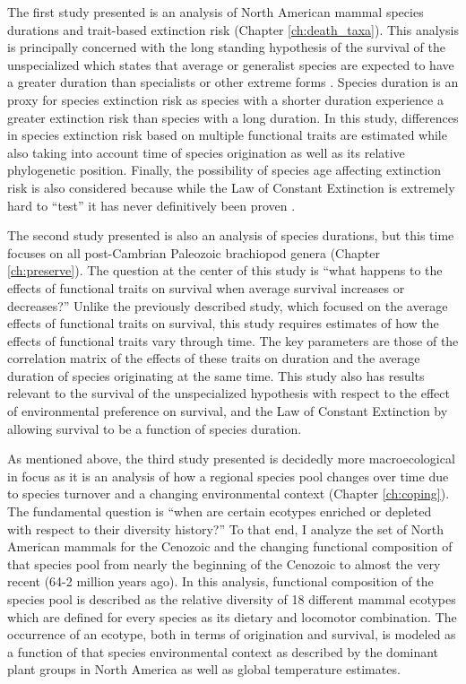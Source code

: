 The first study presented is an analysis of North American mammal species durations and trait-based extinction risk (Chapter \ref{ch:death_taxa}). This analysis is principally concerned with the long standing hypothesis of the survival of the unspecialized which states that average or generalist species are expected to have a greater duration than specialists or other extreme forms \citep{Simpson1944,Liow2004a,Liow2007b}. Species duration is an proxy for species extinction risk as species with a shorter duration experience a greater extinction risk than species with a long duration. In this study, differences in species extinction risk based on multiple functional traits are estimated while also taking into account time of species origination as well as its relative phylogenetic position. Finally, the possibility of species age affecting extinction risk is also considered because while the Law of Constant Extinction is extremely hard to ``test'' it has never definitively been proven \citep{VanValen1973,Liow2011a}.

The second study presented is also an analysis of species durations, but this time focuses on all post-Cambrian Paleozoic brachiopod genera (Chapter \ref{ch:preserve}). The question at the center of this study is ``what happens to the effects of functional traits on survival when average survival increases or decreases?'' Unlike the previously described study, which focused on the average effects of functional traits on survival, this study requires estimates of how the effects of functional traits vary through time. The key parameters are those of the correlation matrix of the effects of these traits on duration and the average duration of species originating at the same time. This study also has results relevant to the survival of the unspecialized hypothesis with respect to the effect of environmental preference on survival, and the Law of Constant Extinction by allowing survival to be a function of species duration.

As mentioned above, the third study presented is decidedly more macroecological in focus as it is an analysis of how a regional species pool changes over time due to species turnover and a changing environmental context (Chapter \ref{ch:coping}). The fundamental question is ``when are certain ecotypes enriched or depleted with respect to their diversity history?'' To that end, I analyze the set of North American mammals for the Cenozoic and the changing functional composition of that species pool from nearly the beginning of the Cenozoic to almost the very recent (64-2 million years ago). In this analysis, functional composition of the species pool is described as the relative diversity of 18 different mammal ecotypes which are defined for every species as its dietary and locomotor combination. The occurrence of an ecotype, both in terms of origination and survival, is modeled as a function of that species environmental context as described by the dominant plant groups in North America as well as global temperature estimates.

